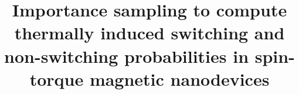 \documentclass[journal,transmag]{IEEEtran}
\begin{document}
%
\title{Importance sampling to compute thermally induced switching and non-switching probabilities in spin-torque magnetic nanodevices}




\author{
}



%







\end{document}
